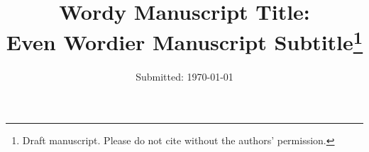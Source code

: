
  \title{\vspace{-15mm}\fontsize{21pt}{10pt}\selectfont\textbf{Wordy Manuscript Title: \\Even Wordier Manuscript Subtitle\thanks{Draft manuscript. Please do not cite without the authors' permission.}}}

	\date{Submitted: \usvardate\today}

\makeatletter
\renewcommand{\@maketitle}{
\newpage
 \null
 \vskip 2em%
 \begin{center}%
  {\LARGE \@title \par}%
 \end{center}%
 \par} \makeatother
